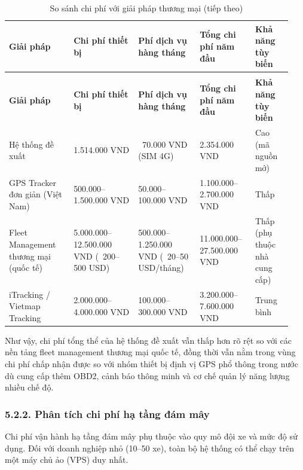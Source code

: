 \documentclass[a4paper]{extarticle}
\newcommand{\thesissettableid}[2]{%
  \renewcommand{\thetable}{#1}%
  \renewcommand{\theHtable}{#2}%
}
\begin{document}
{\thesissettableid{5.5}{tab-ch5-so-sanh-chi-phi-voi-giai-phap-thuong-mai}
\def\LTcaptype{table}
\begin{longtable}{|L{0.215\linewidth}|L{0.213\linewidth}|L{0.205\linewidth}|L{0.183\linewidth}|L{0.129\linewidth}|}
\caption{So sánh chi phí với giải pháp thương mại}\label{tab:ch5-so-sanh-chi-phi-voi-giai-phap-thuong-mai}\\
\hline \textbf{Giải pháp} & \textbf{Chi phí thiết bị} & \textbf{Phí dịch vụ hàng tháng} & \textbf{Tổng chi phí năm
đầu} & \textbf{Khả năng tùy biến} \\
\hline
\endfirsthead
\caption[]{So sánh chi phí với giải pháp thương mại (tiếp theo)}\\
\hline \textbf{Giải pháp} & \textbf{Chi phí thiết bị} & \textbf{Phí dịch vụ hàng tháng} & \textbf{Tổng chi phí năm
đầu} & \textbf{Khả năng tùy biến} \\
\hline
\endhead
\hline
\endfoot
\endlastfoot
Hệ thống đề xuất & 1.514.000 VND & ~70.000 VND
(SIM 4G) & 2.354.000 VND & Cao (mã nguồn mở) \\\hline
GPS Tracker đơn giản (Việt Nam) & 500.000--1.500.000 VND &
50.000--100.000 VND & 1.100.000--2.700.000 VND & Thấp \\\hline
Fleet Management thương mại (quốc tế) & 5.000.000--12.500.000 VND
(~200--500 USD) & 500.000--1.250.000 VND
(~20--50 USD/tháng) & 11.000.000--27.500.000 VND & Thấp
(phụ thuộc nhà cung cấp) \\\hline
iTracking / Vietmap Tracking & 2.000.000--4.000.000 VND &
100.000--300.000 VND & 3.200.000--7.600.000 VND & Trung bình \\\hline
\end{longtable}
}


Như vậy, chi phí tổng thể của hệ thống đề xuất vẫn thấp hơn rõ rệt so
với các nền tảng fleet management thương mại quốc tế, đồng thời vẫn nằm
trong vùng chi phí chấp nhận được so với nhóm thiết bị định vị GPS phổ thông
trong nước dù cung cấp thêm OBD2, cảnh báo thông minh và cơ chế quản lý
năng lượng nhiều chế độ.

\subsubsection{5.2.2. Phân tích chi phí hạ tầng đám
mây}\label{522-phuxe2n-tuxedch-chi-phuxed-hux1ea1-tux1ea7ng-ux111uxe1m-muxe2y}

Chi phí vận hành hạ tầng đám mây phụ thuộc vào quy mô đội xe và mức độ
sử dụng. Đối với doanh nghiệp nhỏ (10--50 xe), toàn bộ hệ thống có thể
chạy trên một máy chủ ảo (VPS) duy nhất.
\end{document}
